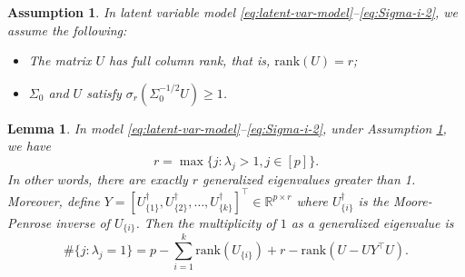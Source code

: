 \documentclass[11pt]{article}
\newcommand{\nb}[1]{\textcolor{orange}{\texttt{[#1]}}}
\newcommand{\dc}[1]{\{#1\}} %
\newcommand{\0}{{\mathbf{0}}}
\newcommand{\op}{{\mathrm{op}}}
\newcommand{\rank}{{\mathrm{rank}}}
\newtheorem{lemma}[theorem]{Lemma}
\newtheorem{assumption}[theorem]{Assumption}
\begin{document}

\begin{assumption}
      \label{ass:latent}
In latent variable model \eqref{eq:latent-var-model}--\eqref{eq:Sigma-i-2}, 
we assume the following:
\begin{itemize}
\item The matrix $U$ has full column rank, that is, $\rank(U)=r$;
\item $\Sigma_0$ and $U$ satisfy $\sigma_r(\Sigma_0^{-1/2}U) \geq 1$.
\end{itemize}
\end{assumption}


\begin{lemma}
      \label{lem:eigengap}
In model \eqref{eq:latent-var-model}--\eqref{eq:Sigma-i-2},
under Assumption \ref{ass:latent},
we have \begin{equation}
r=\max\{j: \lambda_j>1, j\in[p]\}.
\end{equation}
In other words, there are exactly $r$ generalized eigenvalues greater than 1. 
Moreover, define 
$Y=[{ U_{\dc{1}}^\dagger}, { U_{\dc{2}}^\dagger}, \dots, { U_{\dc{k}}^\dagger}]^\top \in\mathbb{R}^{p\times r}$
where ${ U_{\dc{i}}^\dagger}$ is the 
Moore-Penrose inverse of ${ U_{\dc{i}}}$. 
Then the multiplicity of $1$ as a generalized eigenvalue is
\begin{equation}
\#\{j:\lambda_j=1\} =p-\sum_{i=1}^k \rank(U_{\dc{i}})+r- \rank(U-UY^\top U).
\end{equation}
\end{lemma}
\end{document}

